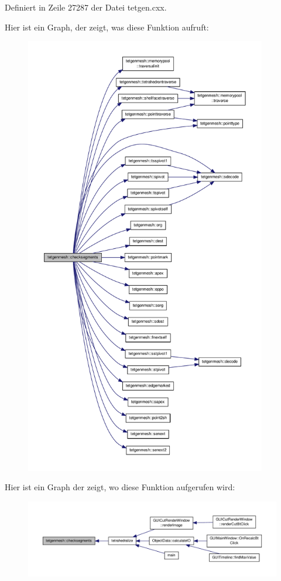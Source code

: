 Definiert in Zeile 27287 der Datei tetgen.\-cxx.



Hier ist ein Graph, der zeigt, was diese Funktion aufruft\-:
\nopagebreak
\begin{figure}[H]
\begin{center}
\leavevmode
\includegraphics[height=550pt]{classtetgenmesh_ae2cbec9eb2c18f23e2046780841c9f6a_cgraph}
\end{center}
\end{figure}




Hier ist ein Graph der zeigt, wo diese Funktion aufgerufen wird\-:
\nopagebreak
\begin{figure}[H]
\begin{center}
\leavevmode
\includegraphics[width=350pt]{classtetgenmesh_ae2cbec9eb2c18f23e2046780841c9f6a_icgraph}
\end{center}
\end{figure}


